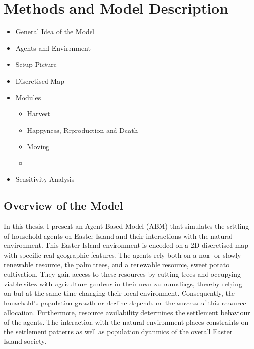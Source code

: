 \section{Methods and Model Description}

\begin{itemize}
	\item  General Idea of the Model
	\item Agents and Environment
	\item Setup Picture
	\item Discretised Map
	\item Modules
		\begin{itemize}
			\item Harvest 
			\item Happyness, Reproduction and Death
			\item Moving
			\item 
		\end{itemize}
	\item Sensitivity Analysis
\end{itemize}


\subsection{Overview of the Model}

In this thesis, I present an Agent Based Model (ABM) that simulates the settling of household agents on Easter Island and their interactions with the natural environment. 
This Easter Island environment is encoded on a 2D discretised map with specific real geographic features.
The agents rely both on a non- or slowly renewable resource, the palm trees, and a renewable resource, sweet potato cultivation. 
They gain access to these resources by cutting trees and occupying viable sites with agriculture gardens in their near surroundings, thereby relying on but at the same time changing their local environment.
Consequently, the household's population growth or decline depends on the success of this reosurce allocation. 
Furthermore, resource availability determines the settlement behaviour of the agents.
The interaction with the natural environment places constraints on the settlement patterns as well as population dyanmics of the overall Easter Island society.

